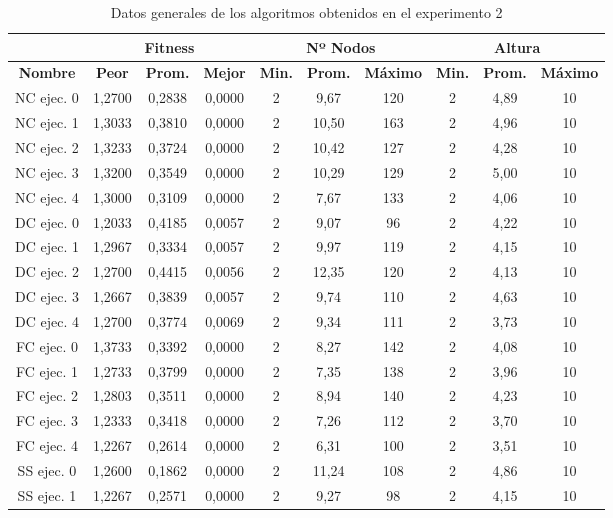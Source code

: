 \begin{table}[hbtp!]
\caption{Datos generales de los algoritmos obtenidos en el experimento 2}\label{tab:resumen_exp2}
\small
\centering
\begin{center}
\begin{tabular}{c|ccc|ccc|ccc}
\hline
{\textbf{}} & \multicolumn{3}{c}{{\textbf{Fitness}}} & \multicolumn{3}{c}{{\textbf{Nº Nodos}}} & \multicolumn{3}{c}{{\textbf{Altura}}} \\ \hline
{\textbf{Nombre}} & \textbf{Peor} &	\textbf{Prom.} & \textbf{Mejor} & \textbf{Min.} & \textbf{Prom.} & \textbf{Máximo} & \textbf{Min.} & \textbf{Prom.} & \textbf{Máximo} \\ \hline
NC ejec. 0 & 1,2700 & 0,2838 & 0,0000 & 2 & 9,67 & 120 & 2 & 4,89 & 10 \\
NC ejec. 1 & 1,3033 & 0,3810 & 0,0000 & 2 & 10,50 & 163 & 2 & 4,96 & 10 \\
NC ejec. 2 & 1,3233 & 0,3724 & 0,0000 & 2 & 10,42 & 127 & 2 & 4,28 & 10 \\
NC ejec. 3 & 1,3200 & 0,3549 & 0,0000 & 2 & 10,29 & 129 & 2 & 5,00 & 10 \\
NC ejec. 4 & 1,3000 & 0,3109 & 0,0000 & 2 & 7,67 & 133 & 2 & 4,06 & 10 \\ \hline
DC ejec. 0 & 1,2033 & 0,4185 & 0,0057 & 2 & 9,07 & 96 & 2 & 4,22 & 10 \\
DC ejec. 1 & 1,2967 & 0,3334 & 0,0057 & 2 & 9,97 & 119 & 2 & 4,15 & 10 \\
DC ejec. 2 & 1,2700 & 0,4415 & 0,0056 & 2 & 12,35 & 120 & 2 & 4,13 & 10 \\
DC ejec. 3 & 1,2667 & 0,3839 & 0,0057 & 2 & 9,74 & 110 & 2 & 4,63 & 10 \\
DC ejec. 4 & 1,2700 & 0,3774 & 0,0069 & 2 & 9,34 & 111 & 2 & 3,73 & 10 \\ \hline
FC ejec. 0 & 1,3733 & 0,3392 & 0,0000 & 2 & 8,27 & 142 & 2 & 4,08 & 10 \\
FC ejec. 1 & 1,2733 & 0,3799 & 0,0000 & 2 & 7,35 & 138 & 2 & 3,96 & 10 \\
FC ejec. 2 & 1,2803 & 0,3511 & 0,0000 & 2 & 8,94 & 140 & 2 & 4,23 & 10 \\
FC ejec. 3 & 1,2333 & 0,3418 & 0,0000 & 2 & 7,26 & 112 & 2 & 3,70 & 10 \\
FC ejec. 4 & 1,2267 & 0,2614 & 0,0000 & 2 & 6,31 & 100 & 2 & 3,51 & 10 \\ \hline
SS ejec. 0 & 1,2600 & 0,1862 & 0,0000 & 2 & 11,24 & 108 & 2 & 4,86 & 10 \\
SS ejec. 1 & 1,2267 & 0,2571 & 0,0000 & 2 & 9,27 & 98 & 2 & 4,15 & 10 \\

\end{tabular}
\end{center}
\end{table}
